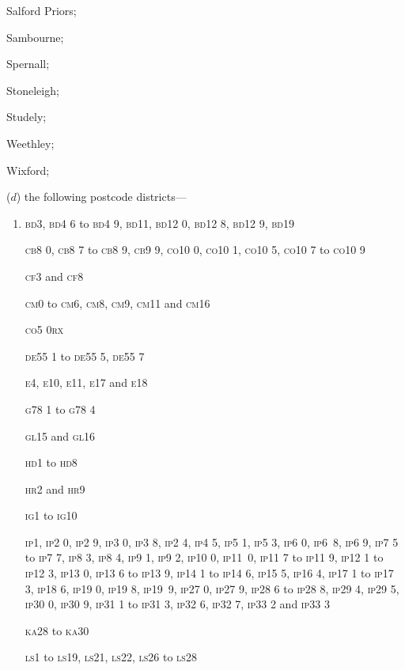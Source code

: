 \documentclass[12pt,a4paper]{article}
\begin{document}
\begin{enumerate}
\begin{enumerate}
    Salford Priors;

    Sambourne;

    Spernall;

    Stoneleigh;

    Studely;

    Weethley;

    Wixford; 
\end{enumerate}

($d$) the following postcode districts—

\newcommand\postcode[1]{\textsc{\lowercase{#1}}}

\begin{enumerate}\item[]
    \postcode{BD3}, \postcode{BD4 6} to \postcode{BD4 9, BD11, BD12 0, BD12 8, BD12 9, BD19}

    \postcode{CB8 0, CB8 7} to \postcode{CB8 9, CB9 9, CO10 0, CO10 1, CO10 5, CO10 7} to \postcode{CO10 9}

    \postcode{CF3} and \postcode{CF8}

    \postcode{CM0} to \postcode{CM6, CM8, CM9, CM11} and \postcode{CM16}

    \postcode{CO5 0RX}

    \postcode{DE55 1} to \postcode{DE55 5, DE55 7}

    \postcode{E4, E10, E11, E17} and \postcode{E18}

    \postcode{G78 1} to \postcode{G78 4}

    \postcode{GL15} and \postcode{GL16}

    \postcode{HD1} to \postcode{HD8}

    \postcode{HR2} and \postcode{HR9}

    \postcode{IG1} to \postcode{IG10}

    \postcode{IP1, IP2 0, IP2 9, IP3 0, IP3 8, IP2 4, IP4 5, IP5 1, IP5 3, IP6 0, IP6~8, IP6 9, IP7 5} to \postcode{IP7 7, IP8 3, IP8 4, IP9 1, IP9 2, IP10 0, IP11~0, IP11 7} to \postcode{IP11 9, IP12 1} to \postcode{IP12 3, IP13 0, IP13 6} to \postcode{IP13 9, IP14 1} to \postcode{IP14 6, IP15 5, IP16 4, IP17 1} to \postcode{IP17 3, IP18 6, IP19 0, IP19 8, IP19~9, IP27 0, IP27 9, IP28 6} to \postcode{IP28 8, IP29 4, IP29 5, IP30 0, IP30 9, IP31 1} to \postcode{IP31 3, IP32 6, IP32 7, IP33 2} and \postcode{IP33 3}

    \postcode{KA28} to \postcode{KA30}

    \postcode{LS1} to \postcode{LS19, LS21, LS22, LS26} to \postcode{LS28}


\end{enumerate}
\end{enumerate}
\end{document}
